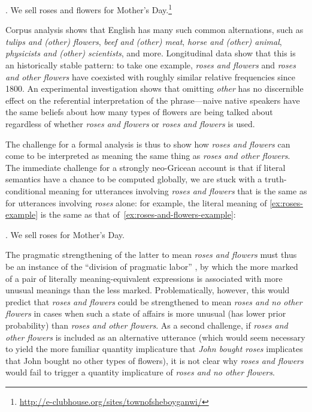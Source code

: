 \documentclass[11pt]{article}
\begin{document}
\ex. We sell roses and flowers for Mother's
Day.\footnote{\url{http://e-clubhouse.org/sites/townofsheboyganwi/}} \label{ex:roses-and-flowers-example}

Corpus analysis shows that English has many such common alternations,
such as \emph{tulips and (other) flowers}, \emph{beef and (other)
  meat}, \emph{horse and (other) animal}, \emph{physicists and (other)
  scientists}, and more.  Longitudinal data show that this is an
historically stable pattern: to take one example, \emph{roses and
  flowers} and \emph{roses and other flowers} have coexisted with
roughly similar relative frequencies since 1800.  An experimental
investigation shows that omitting \emph{other} has no discernible
effect on the referential interpretation of the phrase---naive native
speakers have the same beliefs about how many types of flowers are
being talked about regardless of whether \emph{roses and flowers} or
\emph{roses and flowers} is used.

The challenge for a formal analysis is thus to show how \emph{roses
  and flowers} can come to be interpreted as meaning the same thing as
\emph{roses and other flowers}.  The immediate challenge for a
strongly neo-Gricean account is that if literal semantics have a
chance to be computed globally, we are stuck with a truth-conditional
meaning for utterances involving \emph{roses and flowers} that is the
same as for utterances involving \emph{roses} alone: for example, the
literal meaning of \ref{ex:roses-example} is the same as that
of~\ref{ex:roses-and-flowers-example}:

\ex. We sell roses for Mother's Day. \label{ex:roses-example}

\noindent
The pragmatic strengthening of the latter to mean \emph{roses and
  flowers} must thus be an instance of the ``division of pragmatic
labor'' \citep{horn:1984}, by which the more marked of a pair of
literally meaning-equivalent expressions is associated with more
unusual meanings than the less marked.  Problematically, however, this
would predict that \emph{roses and flowers} could be strengthened to
mean \emph{roses and no other flowers} in cases when such a state of
affairs is more unusual (has lower prior probability) than \emph{roses
  and other flowers}.  As a second challenge, if \emph{roses and other
  flowers} is included as an alternative utterance (which would seem
necessary to yield the more familiar quantity implicature that
\emph{John bought roses} implicates that John bought no other types of
flowers), it is not clear why \emph{roses and flowers} would fail to
trigger a quantity implicature of \emph{roses and no other flowers}.
\end{document}
